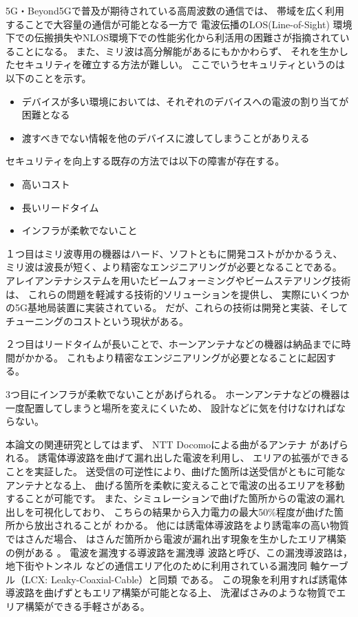\documentclass[technicalreport]{ieicej}
\begin{document}
5G・Beyond5Gで普及が期待されている高周波数の通信では、
帯域を広く利用することで大容量の通信が可能となる一方で
電波伝播のLOS(Line-of-Sight)
環境下での伝搬損失やNLOS環境下での性能劣化から利活用の困難さが指摘されていることになる。
また、ミリ波は高分解能があるにもかかわらず、
それを生かしたセキュリティを確立する方法が難しい。
ここでいうセキュリティというのは以下のことを示す。

\begin{itemize}
  \item デバイスが多い環境においては、それぞれのデバイスへの電波の割り当てが困難となる
  \item 渡すべきでない情報を他のデバイスに渡してしまうことがありえる
\end{itemize}

セキュリティを向上する既存の方法では以下の障害が存在する。

\begin{itemize}
  \item 高いコスト
  \item 長いリードタイム
  \item インフラが柔軟でないこと
\end{itemize}

１つ目はミリ波専用の機器はハード、ソフトともに開発コストがかかるうえ、
ミリ波は波長が短く、より精密なエンジニアリングが必要となることである。
アレイアンテナシステムを用いたビームフォーミングやビームステアリング技術は、
これらの問題を軽減する技術的ソリューションを提供し、
実際にいくつかの5G基地局装置に実装されている。
だが、これらの技術は開発と実装、そしてチューニングのコストという現状がある。

２つ目はリードタイムが長いことで、ホーンアンテナなどの機器は納品までに時間がかかる。
これもより精密なエンジニアリングが必要となることに起因する。

3つ目にインフラが柔軟でないことがあげられる。
ホーンアンテナなどの機器は一度配置してしまうと場所を変えにくいため、
設計などに気を付けなければならない。

本論文の関連研究としてはまず、
NTT Docomoによる曲がるアンテナ
\cite{bending_antenna} \cite{leaky_wave_antenna_bent_dielectric}
があげられる。
誘電体導波路を曲げて漏れ出した電波を利用し、
エリアの拡張ができることを実証した。
送受信の可逆性により、曲げた箇所は送受信がともに可能なアンテナとなる上、
曲げる箇所を柔軟に変えることで電波の出るエリアを移動することが可能です。
また、シミュレーションで曲げた箇所からの電波の漏れ出しを可視化しており、
こちらの結果から入力電力の最大50\%程度が曲げた箇所から放出されることが
わかる。
他には誘電体導波路をより誘電率の高い物質ではさんだ場合、
はさんだ箇所から電波が漏れ出す現象を生かしたエリア構築の例がある
\cite{pinching_antenna}。
電波を漏洩する導波路を漏洩導
波路と呼び、この漏洩導波路は，地下街やトンネル
などの通信エリア化のために利用されている漏洩同
軸ケーブル（LCX: Leaky-Coaxial-Cable）と同類
である。
この現象を利用すれば誘電体導波路を曲げずともエリア構築が可能となる上、
洗濯ばさみのような物質でエリア構築ができる手軽さがある。
\end{document}
